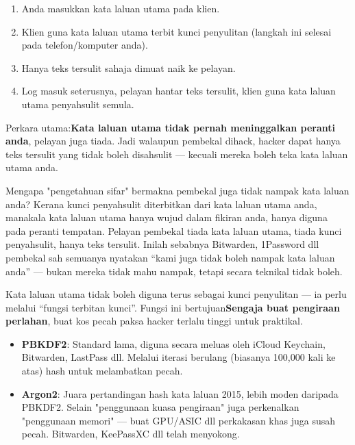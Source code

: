 \begin{enumerate}
  \item Anda masukkan kata laluan utama pada klien.
  \item Klien guna kata laluan utama terbit kunci penyulitan (langkah ini selesai pada telefon/komputer anda).
  \item Hanya teks tersulit sahaja dimuat naik ke pelayan.
  \item Log masuk seterusnya, pelayan hantar teks tersulit, klien guna kata laluan utama penyahsulit semula.
\end{enumerate}

Perkara utama:\textbf{Kata laluan utama tidak pernah meninggalkan peranti anda}, pelayan juga tiada. Jadi walaupun pembekal dihack, hacker dapat hanya teks tersulit yang tidak boleh disahsulit — kecuali mereka boleh teka kata laluan utama anda.

\begin{tcbinfo}{Mengapa "pengetahuan sifar" bermakna pembekal juga tidak nampak kata laluan anda?}
Kerana kunci penyahsulit diterbitkan dari kata laluan utama anda, manakala kata laluan utama hanya wujud dalam fikiran anda, hanya diguna pada peranti tempatan. Pelayan pembekal tiada kata laluan utama, tiada kunci penyahsulit, hanya teks tersulit. Inilah sebabnya Bitwarden, 1Password dll pembekal sah semuanya nyatakan “kami juga tidak boleh nampak kata laluan anda” — bukan mereka tidak mahu nampak, tetapi secara teknikal tidak boleh.

\end{tcbinfo}


Kata laluan utama tidak boleh diguna terus sebagai kunci penyulitan — ia perlu melalui “fungsi terbitan kunci”. Fungsi ini bertujuan\textbf{Sengaja buat pengiraan perlahan}, buat kos pecah paksa hacker terlalu tinggi untuk praktikal.

\begin{itemize}
  \item \textbf{PBKDF2}: Standard lama, diguna secara meluas oleh iCloud Keychain, Bitwarden, LastPass dll. Melalui iterasi berulang (biasanya 100,000 kali ke atas) hash untuk melambatkan pecah.
  \item \textbf{Argon2}: Juara pertandingan hash kata laluan 2015, lebih moden daripada PBKDF2. Selain "penggunaan kuasa pengiraan" juga perkenalkan "penggunaan memori" — buat GPU/ASIC dll perkakasan khas juga susah pecah. Bitwarden, KeePassXC dll telah menyokong.
\end{itemize}

